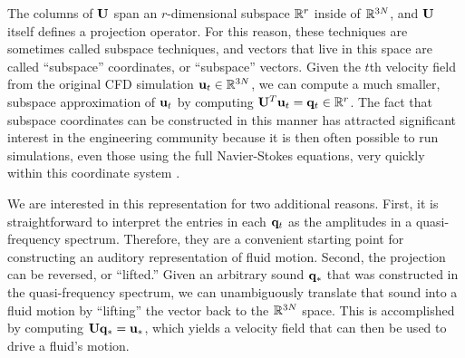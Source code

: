 \documentclass[11pt]{article}
\begin{document}
The columns of $\mathbf{U}$ span an $r$-dimensional subspace $\mathbb{R}^r$ inside of $\mathbb{R}^{3N}$, and $\mathbf{U}$ itself defines a projection operator. For this reason, these techniques are sometimes called subspace techniques, and vectors that live in this space are called ``subspace'' coordinates, or ``subspace'' vectors. Given the $t$th velocity field from the original CFD simulation $\mathbf{u}_t \in \mathbb{R}^{3N}$, we can compute a much smaller, subspace approximation of $\mathbf{u}_t$ by computing $\mathbf{U}^T \mathbf{u}_t = \mathbf{q}_t \in \mathbb{R}^r$. The fact that subspace coordinates can be constructed in this manner has attracted significant interest in the engineering community because it is then often possible to run simulations, even those using the full Navier-Stokes equations, very quickly within this coordinate system \cite{Kim2013}.

We are interested in this representation for two additional reasons. First, it is straightforward to interpret the entries in each $\mathbf{q}_t$ as the amplitudes in a quasi-frequency spectrum. Therefore, they are a convenient starting point for constructing an auditory representation of fluid motion. Second, the projection can be reversed, or ``lifted.'' Given an arbitrary sound $\mathbf{q}_*$ that was constructed in the quasi-frequency spectrum, we can unambiguously translate that sound into a fluid motion by ``lifting'' the vector back to the $\mathbb{R}^{3N}$ space. This is accomplished by computing $\mathbf{U} \mathbf{q}_* = \mathbf{u}_*$, which yields a velocity field that can then be used to drive a fluid's motion.
\end{document}
